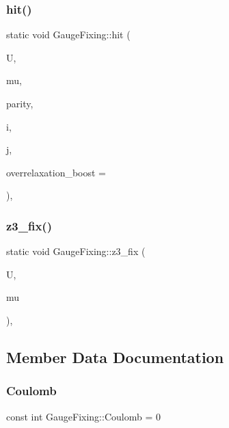 \subsubsection{\texorpdfstring{hit()}{hit()}}
{\footnotesize\ttfamily static void Gauge\+Fixing\+::hit (\begin{DoxyParamCaption}\item[{\hyperlink{classgauge__field}{gauge\+\_\+field} \&}]{U,  }\item[{int}]{mu,  }\item[{int}]{parity,  }\item[{int}]{i,  }\item[{int}]{j,  }\item[{\hyperlink{mdp__global__vars_8h_a69d96b74c791e0bbdb888b3913a69450}{mdp\+\_\+real}}]{overrelaxation\+\_\+boost = {} }\end{DoxyParamCaption})\hspace{0.3cm}{\ttfamily [inline]}, {\ttfamily [static]}}

\mbox{\label{class_gauge_fixing_af3a79f5db7d5c4cef7074938578eff80}} 
\subsubsection{\texorpdfstring{z3\+\_\+fix()}{z3\_fix()}}
{\footnotesize\ttfamily static void Gauge\+Fixing\+::z3\+\_\+fix (\begin{DoxyParamCaption}\item[{\hyperlink{classgauge__field}{gauge\+\_\+field} \&}]{U,  }\item[{int}]{mu }\end{DoxyParamCaption})\hspace{0.3cm}{\ttfamily [inline]}, {\ttfamily [static]}}



\subsection{Member Data Documentation}
\mbox{\label{class_gauge_fixing_a8be5d99ab21951db104df17ffdd7362f}} 
\subsubsection{\texorpdfstring{Coulomb}{Coulomb}}
{\footnotesize\ttfamily const int Gauge\+Fixing\+::\+Coulomb = 0\hspace{0.3cm}{\ttfamily [static]}}

